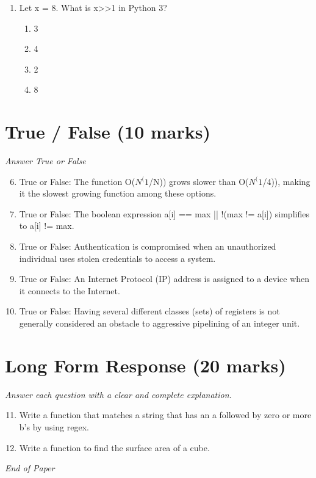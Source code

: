 \documentclass[12pt]{article}
\begin{document}
\begin{enumerate}[label=\arabic*.]
\begin{enumerate}[label=(\alph*)]
    \item xyz
    \item xy
    \item xxzy
    \item xxxxy
\end{enumerate}
\item Let x = 8. What is x\textgreater{}\textgreater{}1 in Python 3?
\begin{enumerate}[label=(\alph*)]
    \item 3
    \item 4
    \item 2
    \item 8
\end{enumerate}
\end{enumerate}

\section*{True / False (10 marks)}
\textit{Answer True or False}
\begin{enumerate}[label=\arabic*.]
\setcounter{enumi}{5}
\item True or False: The function O($N^(1$/N)) grows slower than O($N^(1$/4)), making it the slowest growing function among these options.
\item True or False: The boolean expression a[i] == max || !(max != a[i]) simplifies to a[i] != max.
\item True or False: Authentication is compromised when an unauthorized individual uses stolen credentials to access a system.
\item True or False: An Internet Protocol (IP) address is assigned to a device when it connects to the Internet.
\item True or False: Having several different classes (sets) of registers is not generally considered an obstacle to aggressive pipelining of an integer unit.
\end{enumerate}

\section*{Long Form Response (20 marks)}
\textit{Answer each question with a clear and complete explanation.}
\begin{enumerate}[label=\arabic*.]
\setcounter{enumi}{10}
\item Write a function that matches a string that has an a followed by zero or more b's by using regex.
\item Write a function to find the surface area of a cube.
\end{enumerate}

\vfill
\noindent\textit{End of Paper}
\end{document}
